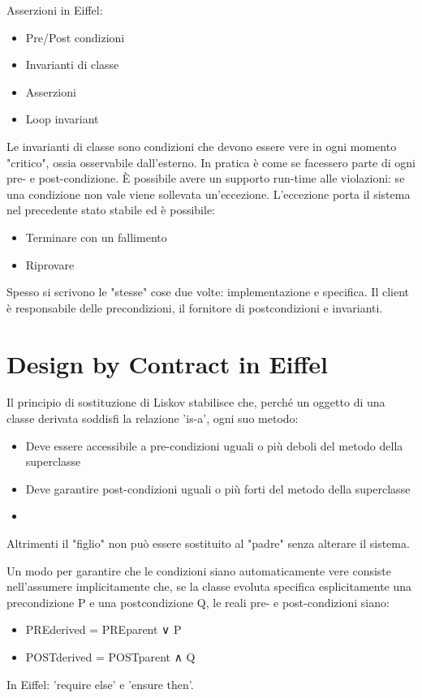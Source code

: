\documentclass[a4paper,12pt,titlepage,oneside]{book}
\begin{document}
    Asserzioni in Eiffel:
\begin{itemize}
    \item Pre/Post condizioni
    \item Invarianti di classe
    \item Asserzioni
    \item Loop invariant
\end{itemize}
    Le invarianti di classe sono condizioni che devono essere vere in ogni momento "critico", ossia osservabile dall’esterno. In pratica è come se facessero parte di ogni pre- e post-condizione.
    È possibile avere un supporto run-time alle violazioni: se una condizione non vale viene sollevata un'eccezione. L'eccezione porta il sistema nel precedente stato stabile ed è possibile:
\begin{itemize}
    \item Terminare con un fallimento
    \item Riprovare
\end{itemize}
    Spesso si scrivono le "stesse" cose due volte: implementazione e specifica.
    Il client è responsabile delle precondizioni, il fornitore di postcondizioni e invarianti.

\section{Design by Contract in Eiffel}
    Il principio di sostituzione di Liskov stabilisce che, perché un oggetto di una classe derivata soddisfi la relazione 'is-a', ogni suo metodo:
\begin{itemize}
    \item Deve essere accessibile a pre-condizioni uguali o più deboli del metodo della superclasse
    \item Deve garantire post-condizioni uguali o più forti del metodo della superclasse 
    \item 
\end{itemize}
    Altrimenti il "figlio" non può essere sostituito al "padre" senza alterare il sistema.

    Un modo per garantire che le condizioni siano automaticamente vere consiste nell'assumere implicitamente che, se la classe evoluta specifica esplicitamente una precondizione P e una postcondizione Q, 
    le reali pre- e post-condizioni siano:
\begin{itemize}
    \item PREderived = PREparent ∨ P
    \item POSTderived = POSTparent ∧ Q
\end{itemize}
    In Eiffel: 'require else' e 'ensure then'.
\end{document}

